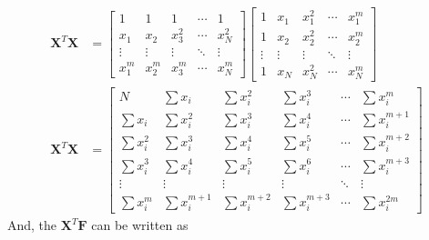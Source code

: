 \documentclass[../../../main.tex]{subfiles}
\begin{document}
\begin{align*}
    \mathbf{X}^T\mathbf{X} & =
    \begin{bmatrix}
        1      & 1      & 1      & \cdots & 1      \\
        x_1    & x_2    & x_3^2  & \cdots & x_N^2  \\
        \vdots & \vdots & \vdots & \ddots & \vdots \\
        x_1^m  & x_2^m  & x_3^m  & \cdots & x_N^m
    \end{bmatrix}
    \begin{bmatrix}
        1      & x_1    & x_1^2  & \cdots & x_1^m  \\
        1      & x_2    & x_2^2  & \cdots & x_2^m  \\
        \vdots & \vdots & \vdots & \ddots & \vdots \\
        1      & x_N    & x_N^2  & \cdots & x_N^m
    \end{bmatrix} \\
    \mathbf{X}^T\mathbf{X} & =
    \begin{bmatrix}
        N            & \sum x_i       & \sum x_i^2     & \sum x_i^3     & \cdots & \sum x_i^m     \\
        \sum x_i     & \sum x_i^2     & \sum x_i^3     & \sum x_i^4     & \cdots & \sum x_i^{m+1} \\
        \sum x_i^2   & \sum x_i^3     & \sum x_i^4     & \sum x_i^5     & \cdots & \sum x_i^{m+2} \\
        \sum x_i^3   & \sum x_i^4     & \sum x_i^5     & \sum x_i^6     & \cdots & \sum x_i^{m+3} \\
        \vdots       & \vdots         & \vdots         & \vdots         & \ddots & \vdots         \\
        \sum x_i^{m} & \sum x_i^{m+1} & \sum x_i^{m+2} & \sum x_i^{m+3} & \cdots & \sum x_i^{2m}
    \end{bmatrix}
\end{align*}
And, the $\mathbf{X}^T \mathbf{F}$ can be written as
\end{document}
